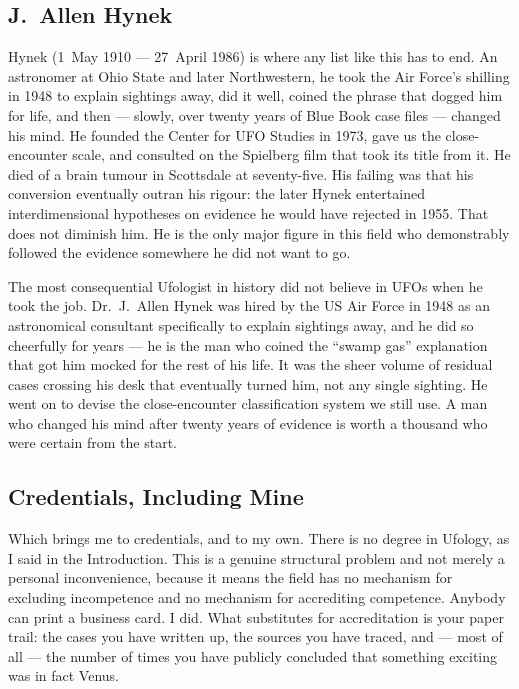 \subsection{J.~Allen Hynek}

Hynek (1~May 1910 --- 27~April 1986) is where any list like this has to
end. An astronomer at Ohio State and later Northwestern, he took the Air Force's shilling
in 1948 to explain sightings away, did it well, coined the phrase that dogged him for life,
and then --- slowly, over twenty years of Blue Book case files --- changed his mind. He
founded the Center for UFO Studies in 1973, gave us the close-encounter scale, and
consulted on the Spielberg film that took its title from it. He died of a brain tumour in
Scottsdale at seventy-five. His failing was that his conversion eventually outran his
rigour: the later Hynek entertained interdimensional hypotheses on evidence he would have
rejected in 1955. That does not diminish him. He is the only major figure in this field who
demonstrably followed the evidence somewhere he did not want to go.

\ufowrapclear
\begin{funfact}
The most consequential Ufologist in history did not believe in UFOs when he took the job.
Dr.~J.~Allen Hynek was hired by the US Air Force in 1948 as an astronomical consultant
specifically to explain sightings away, and he did so cheerfully for years --- he is the
man who coined the ``swamp gas'' explanation that got him mocked for the rest of his
life. It was the sheer volume of residual cases crossing his desk that eventually turned
him, not any single sighting. He went on to devise the close-encounter classification
system we still use. A man who changed his mind after twenty years of evidence is worth a
thousand who were certain from the start.
\end{funfact}

\ufowrapclear
\ufostdportraits

\subsection{Credentials, Including Mine}

Which brings me to credentials, and to my own. There is no degree in Ufology, as I said
in the Introduction. This is a genuine structural problem and not merely a personal
inconvenience, because it means the field has no mechanism for excluding incompetence and
no mechanism for accrediting competence. Anybody can print a business card. I did. What
substitutes for accreditation is your paper trail: the cases you have written up, the
sources you have traced, and --- most of all --- the number of times you have publicly
concluded that something exciting was in fact Venus.

